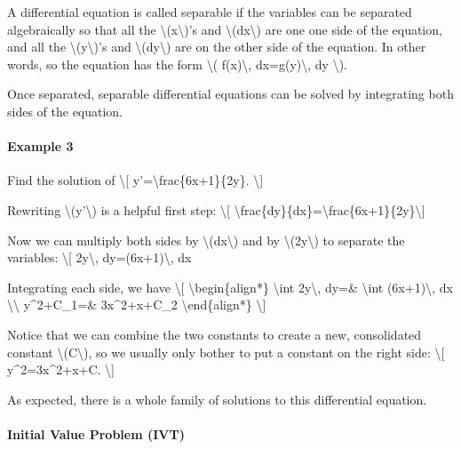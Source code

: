 A differential equation is called separable if the variables can be
separated algebraically so that all the
\textbackslash{}(x\textbackslash{})'s and
\textbackslash{}(dx\textbackslash{}) are one one side of the equation,
and all the \textbackslash{}(y\textbackslash{})'s and
\textbackslash{}(dy\textbackslash{}) are on the other side of the
equation. In other words, so the equation has the form \textbackslash{}(
f(x)\textbackslash{}, dx=g(y)\textbackslash{}, dy \textbackslash{}).

Once separated, separable differential equations can be solved by
integrating both sides of the equation.

\hypertarget{example-3}{%
\paragraph{Example 3}\label{example-3}}

Find the solution of \textbackslash{}{[}
y'=\textbackslash{}frac\{6x+1\}\{2y\}. \textbackslash{}{]}

Rewriting \textbackslash{}(y'\textbackslash{}) is a helpful first step:
\textbackslash{}{[}
\textbackslash{}frac\{dy\}\{dx\}=\textbackslash{}frac\{6x+1\}\{2y\}\textbackslash{}{]}

Now we can multiply both sides by \textbackslash{}(dx\textbackslash{})
and by \textbackslash{}(2y\textbackslash{}) to separate the variables:
\textbackslash{}{[} 2y\textbackslash{}, dy=(6x+1)\textbackslash{}, dx

Integrating each side, we have \textbackslash{}{[}
\textbackslash{}begin\{align*\} \textbackslash{}int 2y\textbackslash{},
dy=\& \textbackslash{}int (6x+1)\textbackslash{}, dx
\textbackslash{}\textbackslash{} y\^{}2+C\_1=\& 3x\^{}2+x+C\_2
\textbackslash{}end\{align*\} \textbackslash{}{]}

Notice that we can combine the two constants to create a new,
consolidated constant \textbackslash{}(C\textbackslash{}), so we usually
only bother to put a constant on the right side: \textbackslash{}{[}
y\^{}2=3x\^{}2+x+C. \textbackslash{}{]}

As expected, there is a whole family of solutions to this differential
equation.

\hypertarget{initial-value-problem-ivt}{%
\paragraph{Initial Value Problem
(IVT)}\label{initial-value-problem-ivt}}

